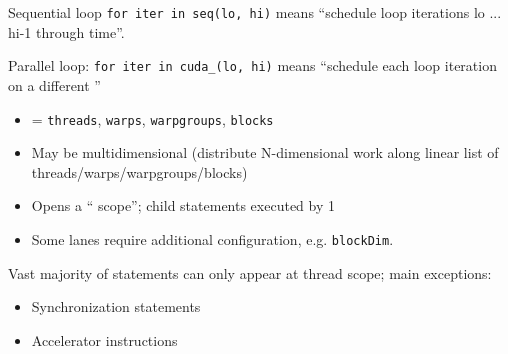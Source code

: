 \newpage
{}

\begin{minipage}[t]{0.5\textwidth}\fixminipage
{}

Sequential loop \texttt{for iter in seq(lo, hi)} means ``schedule loop iterations lo ... hi-1 through time''.

Parallel loop: \texttt{for iter in cuda\_(lo, hi)} means ``schedule each loop iteration on a different ''
\begin{itemize}
  \item {} = \texttt{threads}, \texttt{warps}, \texttt{warpgroups}, \texttt{blocks}
  \item May be multidimensional (distribute N-dimensional work along linear list of threads/warps/warpgroups/blocks)
  \item Opens a `` scope''; child statements executed by 1 
  \item Some lanes require additional configuration, e.g. \texttt{blockDim}.
\end{itemize}

Vast majority of statements can only appear at thread scope; main exceptions:
\begin{itemize}
  \item Synchronization statements
  \item Accelerator instructions
\end{itemize}
\end{minipage}
\hfill

